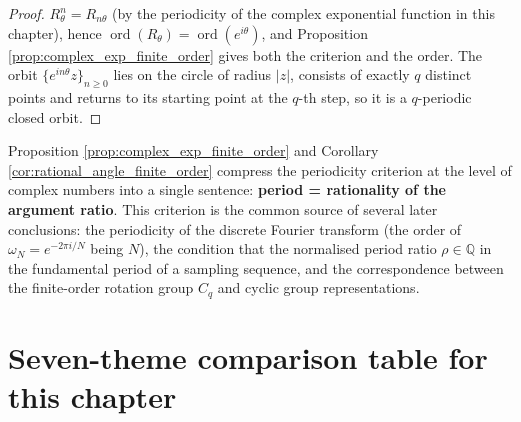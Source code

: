 \begin{proof}
$R_\theta^n=R_{n\theta}$ (by the periodicity of the complex exponential function in this chapter), hence $\operatorname{ord}(R_\theta)=\operatorname{ord}(e^{i\theta})$, and Proposition \ref{prop:complex_exp_finite_order} gives both the criterion and the order. The orbit $\{e^{in\theta}z\}_{n\ge0}$ lies on the circle of radius $|z|$, consists of exactly $q$ distinct points and returns to its starting point at the $q$-th step, so it is a $q$-periodic closed orbit.
\end{proof}

\begin{remark}\label{rem:complex_period_interface}
Proposition \ref{prop:complex_exp_finite_order} and Corollary \ref{cor:rational_angle_finite_order} compress the periodicity criterion at the level of complex numbers into a single sentence: \textbf{period = rationality of the argument ratio}. This criterion is the common source of several later conclusions: the periodicity of the discrete Fourier transform (the order of $\omega_N=e^{-2\pi i/N}$ being $N$), the condition that the normalised period ratio $\rho\in\mathbb{Q}$ in the fundamental period of a sampling sequence, and the correspondence between the finite-order rotation group $C_q$ and cyclic group representations.
\end{remark}


\section*{Seven-theme comparison table for this chapter}

